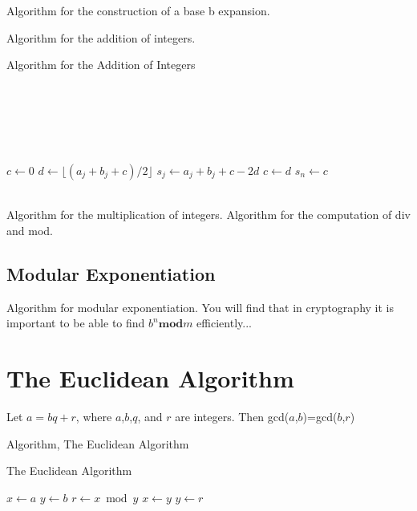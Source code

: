 Algorithm for the construction of a base b expansion.

Algorithm for the addition of integers.
\begin{algorithm}
\caption{Algorithm for the Addition of Integers}
\begin{algorithmic}[1]
\\
\\
\\
\\
\\
\State $c \gets 0$
  \State $d    \gets \lfloor(a_j+b_j+c)/2\rfloor$
  \State $s_j \gets a_j+b_j+c-2d$
  \State $c   \gets d$
\EndFor 
\State $s_n \gets c$\\
\\
\EndProcedure
\end{algorithmic}
\end{algorithm}

Algorithm for the multiplication of integers.
Algorithm for the computation of div and mod.

  \subsection {Modular Exponentiation}
Algorithm for modular exponentiation.
You will find that in cryptography it is important to be able to find $b^n \mathbf{mod} m$ efficiently...

\section {The Euclidean Algorithm}
\begin{lemma}
Let $a=bq+r$, where $a$,$b$,$q$, and $r$ are integers. Then gcd($a$,$b$)=gcd($b$,$r$)
\end{lemma}
Algorithm, The Euclidean Algorithm

\begin{algorithm}
\caption{The Euclidean Algorithm}
\begin{algorithmic}[1]
\State $x \gets a$
\State $y \gets b$
  \State $r  \gets x \bmod y$
  \State $x \gets y$
  \State $y \gets r$
\EndWhile
\State {} 
\EndProcedure
\end{algorithmic}
\end{algorithm}




